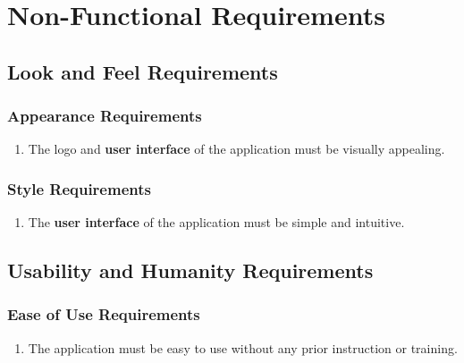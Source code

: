 \documentclass[]{article}
\begin{document}
\section{Non-Functional Requirements}
\label{sec:non-functional_requirements}
\subsection{Look and Feel Requirements}
\label{sub:look_and_feel_requirements}

\cbstart
\subsubsection{Appearance Requirements}
\label{ssub:appearance_requirements}
\begin{enumerate}[{LF}1. ]
	\item The logo and \textbf{user interface} of the application must be visually appealing.
\end{enumerate}
\cbend

\cbstart
\subsubsection{Style Requirements}
\label{ssub:style_requirements}
\begin{enumerate}[{LF}2. ]
	\item The \textbf{user interface} of the application must be simple and intuitive.
\end{enumerate}
\cbend


\subsection{Usability and Humanity Requirements}
\label{sub:usability_and_humanity_requirements}

\cbstart
\subsubsection{Ease of Use Requirements}
\label{ssub:ease_of_use_requirements}
\begin{enumerate}[{UH}1. ]
	\item The application must be easy to use without any prior instruction or training.
\end{enumerate}
\cbend
\end{document}
